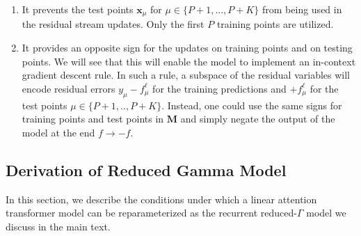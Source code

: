 \documentclass{article} %
\def\x{\bm x}
\begin{document}
\begin{enumerate}
    \item It prevents the test points $\x_\mu$ for $\mu \in \{P+1,...,P+K\}$ from being used in the residual stream updates. Only the first $P$ training points are utilized. 
    \item It provides an opposite sign for the updates on training points and on testing points. We will see that this will enable the model to implement an in-context gradient descent rule. In such a rule, a subspace of the residual variables will encode residual errors $y_\mu - f_\mu^\ell$ for the training predictions and $+ f_\mu^\ell$ for the test points $\mu \in \{P+1,..,P+K\}$. Instead, one could use the same signs for training points and test points in $\bm M$ and simply negate the output of the model at the end $f \to -f$.  
\end{enumerate}


\subsection{Derivation of Reduced Gamma Model}

In this section, we describe the conditions under which a linear attention transformer model can be reparameterized as the recurrent reduced-$\Gamma$ model we discuss in the main text. 
\end{document}
